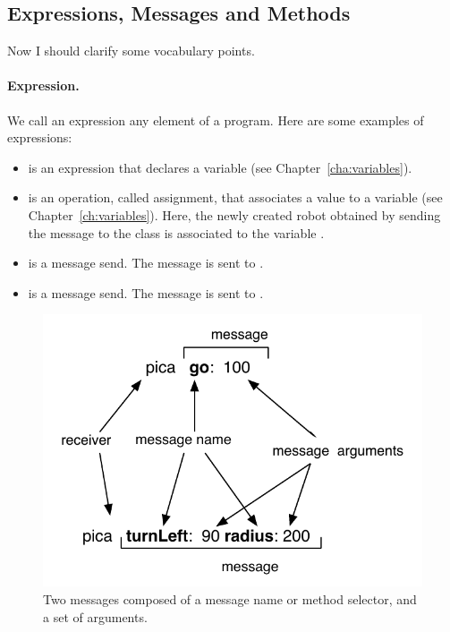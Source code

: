 \subsection{Expressions, Messages and Methods}
Now I should clarify some vocabulary points.

\paragraph{Expression.}
We call an expression any element of a program. Here are some examples of expressions: 

\begin{itemize}
\item {} is an expression that declares a variable (see Chapter~\ref{cha:variables}).
\item {} is an operation, called  assignment,  that associates a value to a variable (see Chapter~\ref{ch:variables}). Here, the newly created robot obtained by sending the message  to the class  is associated to the variable .
\item {} is a message send. The message  is sent to  .
\item {} is a message send. The message  is sent to  .

\end{itemize}




\begin{figure}[h]
\begin{center}\includegraphics{message}
\caption{Two messages composed of  a message name or method selector, and a set of arguments.\label{fig:firstScriptMessage}}\end{center}
\end{figure}

